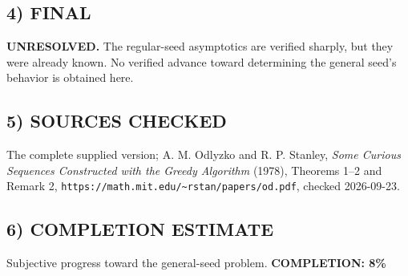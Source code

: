 \subsection*{4) FINAL}
\textbf{UNRESOLVED.} The regular-seed asymptotics are verified sharply, but they were already known. No verified advance toward determining the general seed's behavior is obtained here.
\subsection*{5) SOURCES CHECKED}
The complete supplied version; A. M. Odlyzko and R. P. Stanley, \emph{Some Curious Sequences Constructed with the Greedy Algorithm} (1978), Theorems 1--2 and Remark 2, \texttt{https://math.mit.edu/\~{}rstan/papers/od.pdf}, checked 2026-09-23.
\subsection*{6) COMPLETION ESTIMATE}
Subjective progress toward the general-seed problem.
\textbf{COMPLETION: 8\%}
